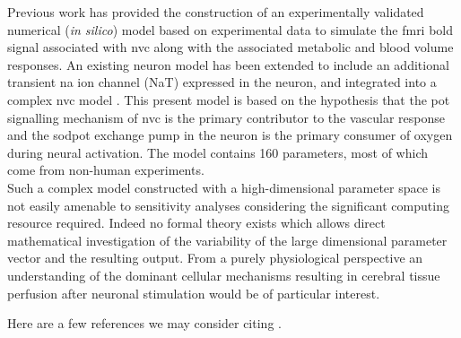 Previous work \cite{Mathias2018} has provided  the construction of an experimentally validated numerical (\textit{in silico}) model based on experimental data to simulate the \gls{fmri} \gls{bold} signal associated with \gls{nvc} along with the associated metabolic and blood volume responses. An existing neuron model \citep{Mathias2017, Mathias2017a} has been extended to include an additional transient \gls{na} ion channel (NaT) expressed in the neuron, and integrated into a complex \gls{nvc} model \citep{Dormanns2015, Dormanns2016, Kenny2017a}. This present model is based on the hypothesis that the \gls{pot} signalling mechanism of \gls{nvc} is the primary contributor to the vascular response and the \gls{sodpot} exchange pump in the neuron is the primary consumer of oxygen during neural activation. The model contains 160 parameters, most of which come from non-human experiments. \\
Such a complex model constructed with a high-dimensional parameter space is not easily amenable to sensitivity analyses considering the significant computing resource required. Indeed no formal theory exists which allows direct mathematical investigation of the variability of the large dimensional parameter vector and the resulting output. 
From a purely physiological perspective an understanding of the dominant cellular mechanisms resulting in cerebral tissue perfusion after neuronal stimulation would be of particular interest.
  
  
Here are a few references we may consider citing  \cite{gsa_pharm,lr_gsa,uqpy,Witthoft2013}.
